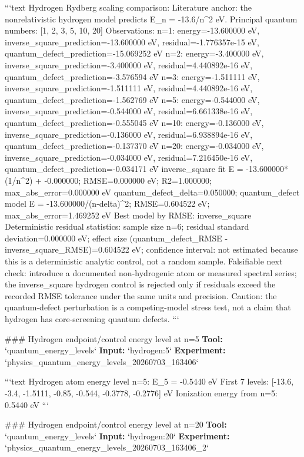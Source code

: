 \documentclass[11pt,a4paper]{article}
\begin{document}
```text
Hydrogen Rydberg scaling comparison:
  Literature anchor: the nonrelativistic hydrogen model predicts E\_n = -13.6/n\textasciicircum{}2 eV.
  Principal quantum numbers: [1, 2, 3, 5, 10, 20]
  Observations:
    n=1: energy=-13.600000 eV, inverse\_square\_prediction=-13.600000 eV, residual=-1.776357e-15 eV, quantum\_defect\_prediction=-15.069252 eV
    n=2: energy=-3.400000 eV, inverse\_square\_prediction=-3.400000 eV, residual=4.440892e-16 eV, quantum\_defect\_prediction=-3.576594 eV
    n=3: energy=-1.511111 eV, inverse\_square\_prediction=-1.511111 eV, residual=4.440892e-16 eV, quantum\_defect\_prediction=-1.562769 eV
    n=5: energy=-0.544000 eV, inverse\_square\_prediction=-0.544000 eV, residual=6.661338e-16 eV, quantum\_defect\_prediction=-0.555045 eV
    n=10: energy=-0.136000 eV, inverse\_square\_prediction=-0.136000 eV, residual=6.938894e-16 eV, quantum\_defect\_prediction=-0.137370 eV
    n=20: energy=-0.034000 eV, inverse\_square\_prediction=-0.034000 eV, residual=7.216450e-16 eV, quantum\_defect\_prediction=-0.034171 eV
  inverse\_square fit E = -13.600000*(1/n\textasciicircum{}2) + -0.000000; RMSE=0.000000 eV; R2=1.000000; max\_abs\_error=0.000000 eV
  quantum\_defect\_delta=0.050000; quantum\_defect model E = -13.600000/(n-delta)\textasciicircum{}2; RMSE=0.604522 eV; max\_abs\_error=1.469252 eV
  Best model by RMSE: inverse\_square
  Deterministic residual statistics: sample size n=6; residual standard deviation=0.000000 eV; effect size (quantum\_defect\_RMSE - inverse\_square\_RMSE)=0.604522 eV; confidence interval: not estimated because this is a deterministic analytic control, not a random sample.
  Falsifiable next check: introduce a documented non-hydrogenic atom or measured spectral series; the inverse\_square hydrogen control is rejected only if residuals exceed the recorded RMSE tolerance under the same units and precision.
  Caution: the quantum-defect perturbation is a competing-model stress test, not a claim that hydrogen has core-screening quantum defects.
```

\#\#\# Hydrogen endpoint/control energy level at n=5
\textbf{Tool:} `quantum\_energy\_levels`
\textbf{Input:} `hydrogen:5`
\textbf{Experiment:} `physics\_quantum\_energy\_levels\_20260703\_163406`

```text
Hydrogen atom energy level n=5:
  E\_5 = -0.5440 eV
  First 7 levels: [-13.6, -3.4, -1.5111, -0.85, -0.544, -0.3778, -0.2776] eV
  Ionization energy from n=5: 0.5440 eV
```

\#\#\# Hydrogen endpoint/control energy level at n=20
\textbf{Tool:} `quantum\_energy\_levels`
\textbf{Input:} `hydrogen:20`
\textbf{Experiment:} `physics\_quantum\_energy\_levels\_20260703\_163406\_2`
\end{document}
